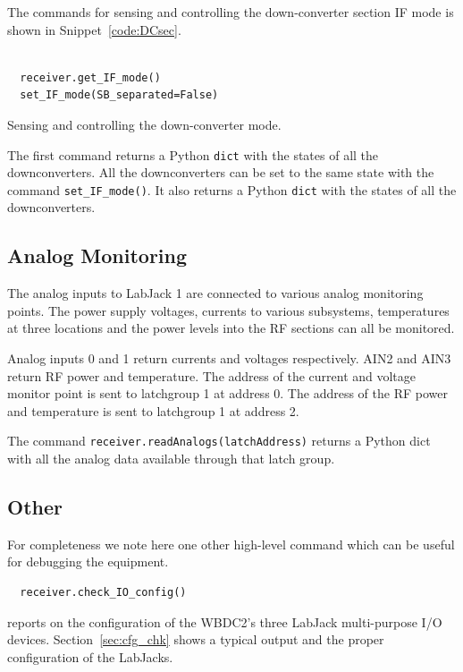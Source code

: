 \documentclass[letterpaper,11pt]{book}
\begin{document}
The commands for sensing and controlling the down-converter section IF mode is
shown in Snippet~\ref{code:DCsec}.
\begin{code}[h!tb]
\begin{center}
  \begin{verbatim}
  
  receiver.get_IF_mode()
  set_IF_mode(SB_separated=False)\end{verbatim}
\caption{\label{code:DCsec}Sensing and controlling the down-converter mode.}
\end{center}
\end{code}
The first command
returns a Python {\tt dict} with the states of all the downconverters.
All the downconverters can be set to the same state with the command
{\tt set\_IF\_mode()}.
It also returns a Python {\tt dict} with the states of all the downconverters.

\subsection{Analog Monitoring}

The analog inputs to LabJack 1 are connected to various analog monitoring
points.
The power supply voltages, currents to various subsystems, temperatures at
three locations and the power levels into the RF sections can all be monitored.

Analog inputs 0 and 1 return currents and voltages respectively. AIN2 and AIN3 
return RF power and temperature. The address of the current and voltage monitor
point is sent to latchgroup 1 at address 0.  The address of the RF power and
temperature is sent to latchgroup 1 at address 2.

The command {\tt receiver.readAnalogs(latchAddress)} returns a Python dict with
all the analog data available through that latch group.

\subsection{Other}

For completeness we note here one other high-level command which can be useful
for debugging the equipment.
\begin{verbatim}
  receiver.check_IO_config()
\end{verbatim}
reports on the configuration of the WBDC2's three LabJack multi-purpose I/O
devices. Section~\ref{sec:cfg_chk} shows a typical output and the proper
configuration of the LabJacks.
\end{document}

